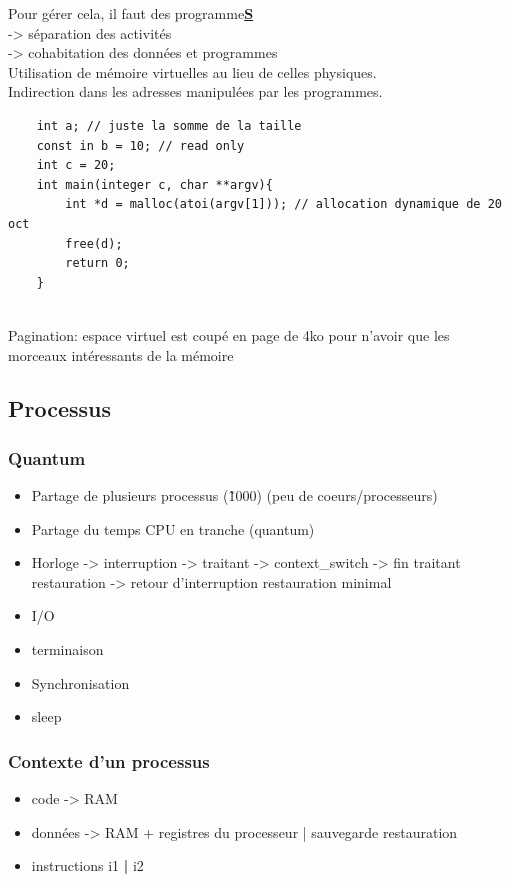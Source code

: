 \documentclass[11pt]{article}
\begin{document}
Pour gérer cela, il faut des programme\textbf{\underline{S}}\\
-> séparation des activités\\
-> cohabitation des données et programmes\\
Utilisation de mémoire virtuelles au lieu de celles physiques.\\
Indirection dans les adresses manipulées par les programmes.

\begin{verbatim}  
    int a; // juste la somme de la taille
    const in b = 10; // read only
    int c = 20;
    int main(integer c, char **argv){
        int *d = malloc(atoi(argv[1])); // allocation dynamique de 20 oct
        free(d);
        return 0;
    }
    
\end{verbatim}

Pagination: espace virtuel est coupé en page de 4ko pour n'avoir que les morceaux intéressants de la mémoire

\subsection{Processus}
\subsubsection{Quantum}
\begin{itemize}
	\item Partage de plusieurs processus (\~1000) (peu de coeurs/processeurs)
	\item Partage du temps CPU en tranche (quantum)
	\item Horloge -> interruption -> traitant -> context\_switch -> fin traitant restauration -> retour d'interruption restauration minimal
	\item I/O
	\item terminaison
	\item Synchronisation
	\item sleep
\end{itemize}
\pagebreak
\subsubsection{Contexte d'un processus}
\begin{itemize}
	\item code -> RAM
	\item données -> RAM + registres du processeur | sauvegarde restauration
	\item instructions i1 \textbf{|} i2
\end{itemize}
\end{document}
